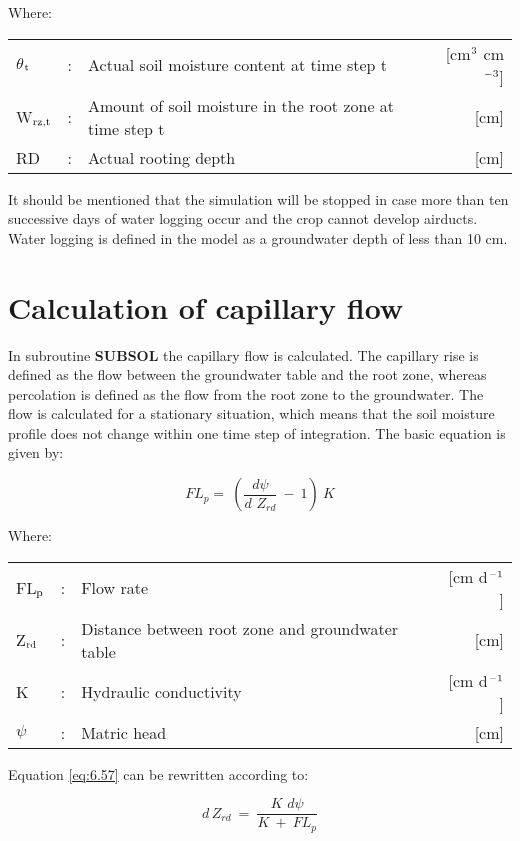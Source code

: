 Where:\\[5pt]
\begin{tabularx}{\textwidth}{llXr}
$\theta$$_{{\rm t}}$ &:& Actual soil moisture content at time step t  
    & [cm$^{{\rm 3}}$ cm$^{{\rm -3}}$]\\
W$_{{\rm rz,t}}$ &:& Amount of soil moisture in the root zone at time step t  & [cm]\\
RD &:& Actual rooting depth  & [cm]\\
\end{tabularx}

It should be mentioned that the simulation will be stopped in case more than ten successive
days of water logging occur and the crop cannot develop airducts. Water logging is defined
in the model as a groundwater depth of less than 10 cm.

\section{Calculation of capillary flow  }
\label{sec:CapillaryFlow}

In subroutine {\bf SUBSOL} the capillary flow is calculated. The capillary rise is defined as
the flow between the groundwater table and the root zone, whereas  percolation is defined
as the flow from the root zone to the groundwater. The flow is calculated for a stationary
situation, which means that the soil moisture profile does not change within one time step
of integration. The basic equation is given by:

\begin{equation}
\label{eq:6.57}
FL _{p} =~({\frac{d \psi }{ d\,\, Z _{rd} }} ~-~ 1)~K
\end{equation}

Where:\\[5pt]
\begin{tabularx}{\textwidth}{llXr}
FL$_{{\rm p}}$ &:& Flow rate  & [cm d$^{{\rm -1}}$]\\
Z$_{{\rm rd}}$ &:& Distance between root zone and groundwater table  & [cm]\\
K &:& Hydraulic conductivity  & [cm d$^{{\rm -1}}$]\\
$\psi$ &:& Matric head  & [cm]\\
\end{tabularx}

Equation \ref{eq:6.57} can be rewritten according to:

\begin{equation}
\label{eq:6.58}
d\, Z _{rd} ~=~{\frac{K\,\, d \psi }{ K ~+~ FL _{p} }}
\end{equation}


